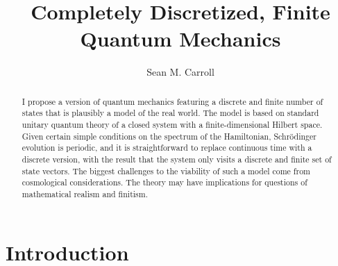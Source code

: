 \documentclass[aps,prd,nofootinbib,notitlepage,12pt]{revtex4-2}
\begin{document}
\thispagestyle{empty}

\newcommand{\be}{\begin{equation}}
\newcommand{\ee}{\end{equation}}
\newcommand{\bea}{\begin{eqnarray}}
\newcommand{\eea}{\end{eqnarray}}
\newcommand{\hst}{\widetilde{\mathcal{H}}} 
\newcommand{\iso}{\dot{=}}
\newcommand{\Dim}{\textrm{dim\,}}
\newcommand{\Tr}{\textrm{Tr\,}}
\newcommand{\hs}{\mathcal{H}} 
\newcommand{\E}{\widetilde{E}}
\newcommand{\thetat}{\tilde{\theta}}
\newcommand{\ham}{\widehat{H}}
\newcommand{\intham}{\widehat{H}_{\rm{int}}}
\newcommand{\selfham}{\widehat{H}_{\rm{self}}}
\newcommand{\dt}{\delta_t}
\newcommand{\trace}{\mathrm{Tr}}
\def\bra#1{\langle #1\rvert}
\def\ket#1{\lvert #1\rangle}
\newcommand{\draftnote}[1]{\textbf{\color{red}[#1]}}



\title{Completely Discretized, Finite Quantum Mechanics}
\author{Sean M. Carroll}

\begin{abstract}
I propose a version of quantum mechanics featuring a discrete and finite number of states that is plausibly a model of the real world.
The model is based on standard unitary quantum theory of a closed system with a finite-dimensional Hilbert space.
Given certain simple conditions on the spectrum of the Hamiltonian, Schr\"odinger evolution is periodic, and it is straightforward to replace continuous time with a discrete version, with the result that the system only visits a discrete and finite set of state vectors.
The biggest challenges to the viability of such a model come from cosmological considerations.
The theory may have implications for questions of mathematical realism and finitism.
\end{abstract}

\maketitle

\section{Introduction}
\end{document}
